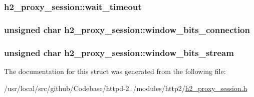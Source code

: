 \subsubsection[{\texorpdfstring{wait\+\_\+timeout}{wait_timeout}}]{ h2\+\_\+proxy\+\_\+session\+::wait\+\_\+timeout}\hypertarget{structh2__proxy__session_a6845156d89a261445999670ec49288fc}{}\label{structh2__proxy__session_a6845156d89a261445999670ec49288fc}
\subsubsection[{\texorpdfstring{window\+\_\+bits\+\_\+connection}{window_bits_connection}}]{\setlength{\rightskip}{0pt plus 5cm}unsigned char h2\+\_\+proxy\+\_\+session\+::window\+\_\+bits\+\_\+connection}\hypertarget{structh2__proxy__session_ad3a2795431b54a9437c79fad5b40fb45}{}\label{structh2__proxy__session_ad3a2795431b54a9437c79fad5b40fb45}
\subsubsection[{\texorpdfstring{window\+\_\+bits\+\_\+stream}{window_bits_stream}}]{\setlength{\rightskip}{0pt plus 5cm}unsigned char h2\+\_\+proxy\+\_\+session\+::window\+\_\+bits\+\_\+stream}\hypertarget{structh2__proxy__session_a883566eeb6fdb2f49d9731da9a9e367c}{}\label{structh2__proxy__session_a883566eeb6fdb2f49d9731da9a9e367c}


The documentation for this struct was generated from the following file\+:\begin{DoxyCompactItemize}
\item 
/usr/local/src/github/\+Codebase/httpd-\/2../modules/http2/\hyperlink{h2__proxy__session_8h}{h2\+\_\+proxy\+\_\+session.\+h}\end{DoxyCompactItemize}
